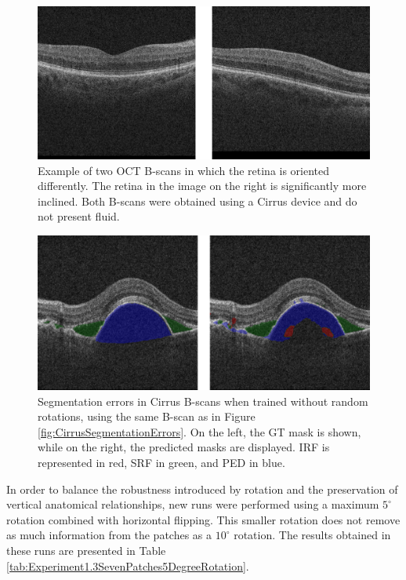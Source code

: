 \begin{figure}[!ht]
	\centering
	\includegraphics[width=0.7\linewidth]{figures/DifferentRetinaOrientation.png}
	\caption{Example of two OCT B-scans in which the retina is oriented differently. The retina in the image on the right is significantly more inclined. Both B-scans were obtained using a Cirrus device and do not present fluid.}
	\label{fig:DifferentRetinaOrientation}
\end{figure}

\begin{figure}[!ht]
	\centering
	\includegraphics[width=0.7\linewidth]{figures/SegmentationErrorsNoRotation.png}
	\caption{Segmentation errors in Cirrus B-scans when trained without random rotations, using the same B-scan as in Figure \ref{fig:CirrusSegmentationErrors}. On the left, the GT mask is shown, while on the right, the predicted masks are displayed. IRF is represented in red, SRF in green, and PED in blue.}
	\label{fig:SegmentationErrorsNoRotation}
\end{figure}

In order to balance the robustness introduced by rotation and the preservation of vertical anatomical relationships, new runs were performed using a maximum $5^{\circ}$ rotation combined with horizontal flipping. This smaller rotation does not remove as much information from the patches as a $10^{\circ}$ rotation. The results obtained in these runs are presented in Table \ref{tab:Experiment1.3SevenPatches5DegreeRotation}.

